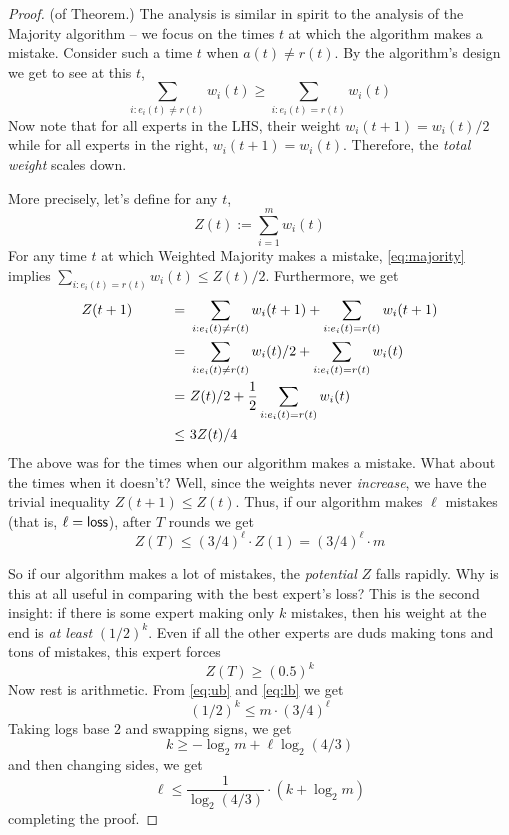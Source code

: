 \documentclass[11pt]{article}
\begin{document}
\begin{proof} (of Theorem.)
	The analysis is similar in spirit to the analysis of the {\sc Majority} algorithm -- we focus on the times $t$ at which the algorithm makes a mistake.
	Consider such a time $t$ when $a(t) \neq r(t)$. By the algorithm's design we get to see at this $t$,
	\begin{equation}\label{eq:majority}
	\sum_{i: e_i(t) \neq r(t)} w_i(t) \geq 	\sum_{i: e_i(t) = r(t)} w_i(t) 
	\end{equation}
	Now note that for all experts in the LHS, their weight $w_i(t+1) = w_i(t)/2$ while for all experts in the right, $w_i(t+1) = w_i(t)$. Therefore,
	the {\em total weight} scales down.
	
	More precisely, let's define for any $t$,
	\[
	Z(t) := \sum_{i=1}^m w_i(t)
	\]
	For any time $t$ at which {\sc Weighted Majority} makes a mistake, \eqref{eq:majority} implies $\sum_{i: e_i(t) = r(t)} w_i(t) \leq Z(t)/2$.
	Furthermore, we get
	\begin{alignat}{4}
	Z(t+1) \qquad && = &~ \sum_{i: e_i(t) \neq r(t)} w_i(t+1) + \sum_{i: e_i(t) = r(t)} w_i(t+1) \notag\\
		   && = &~ \sum_{i: e_i(t) \neq r(t)} w_i(t)/2 + \sum_{i: e_i(t) = r(t)} w_i(t) \notag \\
		   && = &~ Z(t)/2 + \frac{1}{2} \sum_{i: e_i(t) = r(t)} w_i(t) \notag \\
		   && \leq &~ 3Z(t)/4 \notag
	\end{alignat}
	The above was for the times when our algorithm makes a mistake. What about the times when it doesn't? Well, since the weights never {\em increase}, we have the trivial inequality $Z(t+1) \leq Z(t)$.
	Thus, if our algorithm makes $\ell$ mistakes (that is, $\ell = \mathsf{loss}$), after $T$ rounds we get
	\begin{equation}\label{eq:ub}
	Z(T) \leq (3/4)^\ell \cdot Z(1) = (3/4)^\ell \cdot m
	\end{equation}
	
	So if our algorithm makes a lot of mistakes, the {\em potential} $Z$ falls rapidly. Why is this at all useful in comparing with the best expert's loss? 
	This is the second insight: if there is some expert making only $k$ mistakes, then his weight at the end is {\em at least} $(1/2)^k$. Even if all the other experts are duds making tons and tons of mistakes, this expert forces
	\begin{equation}\label{eq:lb}
	Z(T) \geq (0.5)^k
	\end{equation}
	Now rest is arithmetic. From \eqref{eq:ub} and \eqref{eq:lb} we get
	\[
	(1/2)^k \leq m\cdot (3/4)^\ell
	\]
	Taking logs base $2$ and swapping signs, we get
	\[
	k \geq - \log_2 m + \ell \log_2 (4/3)
	\]
	and then changing sides, we get
	\[
	\ell \leq \frac{1}{\log_2(4/3)}\cdot\left(k + \log_2 m\right)
	\]
	completing the proof.
\end{proof}
\end{document}
